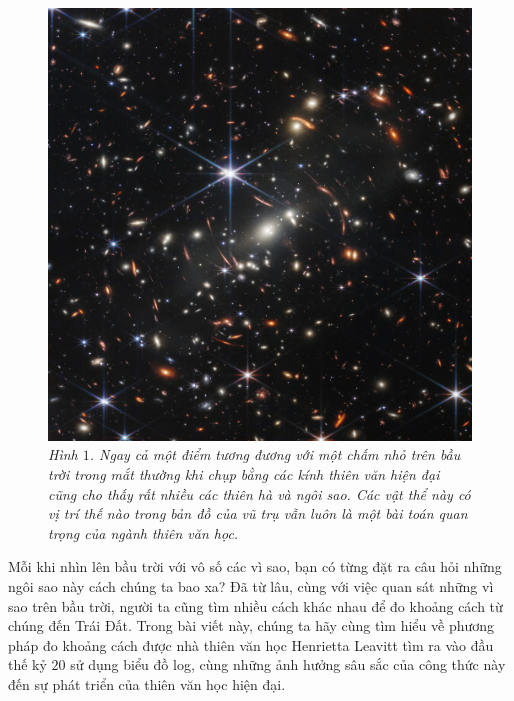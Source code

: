 \begin{multicols}{2}
	\begin{figure}[H]
		\vspace*{5pt}
		\centering
		\captionsetup{labelformat= empty, justification=centering}
		\includegraphics[width= 1\linewidth]{1}
		\caption{\small\textit{\color{timhieukhoahoc}Hình $1$. Ngay cả một điểm tương đương với một chấm nhỏ trên bầu trời trong mắt thường khi chụp bằng các kính thiên văn hiện đại cũng cho thấy rất nhiều các thiên hà và ngôi sao. Các vật thể này có vị trí thế nào trong bản đồ của vũ trụ vẫn luôn là một bài toán quan trọng của ngành thiên văn học.}}
		\vspace*{-10pt}
	\end{figure}
	Mỗi khi nhìn lên bầu trời với vô số các vì sao, bạn có từng đặt ra câu hỏi những ngôi sao này cách chúng ta bao xa? Đã từ lâu, cùng với việc quan sát những vì sao trên bầu trời, người ta cũng tìm nhiều cách khác nhau để đo khoảng cách từ chúng đến Trái Đất. Trong bài viết này, chúng ta hãy cùng tìm hiểu về phương pháp đo khoảng cách được nhà thiên văn học Henrietta Leavitt tìm ra vào đầu thế kỷ $20$ sử dụng biểu đồ log, cùng những ảnh hưởng sâu sắc của công thức này đến sự phát triển của thiên văn học hiện đại.
	

\end{multicols}
